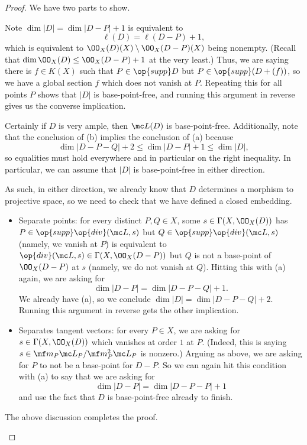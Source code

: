 \documentclass[../notes.tex]{subfiles}
\begin{document}
\begin{proof}
	We have two parts to show.
	\begin{listalph}
		\item Note $\dim|D|=\dim|D-P|+1$ is equivalent to
		\[\ell(D)=\ell(D-P)+1,\]
		which is equivalent to $\OO_X(D)(X)\setminus\OO_X(D-P)(X)$ being nonempty. (Recall that $\dim\OO_X(D)\le\OO_X(D-P)+1$ at the very least.) Thus, we are saying there is $f\in K(X)$ such that $P\in\op{supp}D$ but $P\in\op{supp}(D+(f))$, so we have a global section $f$ which does not vanish at $P$. Repeating this for all points $P$ shows that $|D|$ is base-point-free, and running this argument in reverse gives us the converse implication.

		\item Certainly if $D$ is very ample, then $\mc L(D)$ is base-point-free. Additionally, note that the conclusion of (b) implies the conclusion of (a) because
		\[\dim|D-P-Q|+2\le\dim|D-P|+1\le\dim|D|,\]
		so equalities must hold everywhere and in particular on the right inequality. In particular, we can assume that $|D|$ is base-point-free in either direction.

		As such, in either direction, we already know that $D$ determines a morphism to projective space, so we need to check that we have defined a closed embedding.
		\begin{itemize}
			\item Separate points: for every distinct $P,Q\in X$, some $s\in\Gamma(X,\OO_X(D))$ has $P\in\op{supp}\op{div}(\mc L,s)$ but $Q\in\op{supp}\op{div}(\mc L,s)$ (namely, we vanish at $P$) is equivalent to $\op{div}(\mc L,s)\in\Gamma(X,\OO_X(D-P))$ but $Q$ is not a base-point of $\OO_X(D-P)$ at $s$ (namely, we do not vanish at $Q$). Hitting this with (a) again, we are asking for
			\[\dim|D-P|=\dim|D-P-Q|+1.\]
			We already have (a), so we conclude $\dim|D|=\dim|D-P-Q|+2$. Running this argument in reverse gets the other implication.
			\item Separates tangent vectors: for every $P\in X$, we are asking for $s\in\Gamma(X,\OO_X(D))$ which vanishes at order $1$ at $P$. (Indeed, this is saying $s\in\mf m_P\mc L_P/\mf m_P^2\mc L_P$ is nonzero.) Arguing as above, we are asking for $P$ to not be a base-point for $D-P$. So we can again hit this condition with (a) to say that we are asking for
			\[\dim|D-P|=\dim|D-P-P|+1\]
			and use the fact that $D$ is base-point-free already to finish.
		\end{itemize}
		The above discussion completes the proof.
		\qedhere
	\end{listalph}
\end{proof}
\end{document}
